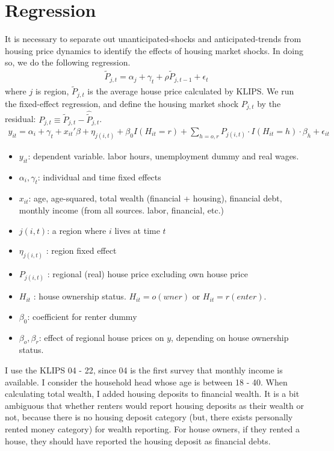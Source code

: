 \documentclass[12pt,letterpaper]{article}
\begin{document}
\section{Regression}
It is necessary to separate out unanticipated-shocks and anticipated-trends from housing price dynamics to identify the effects of housing market shocks. In doing so, we do the following regression.
\begin{eqnarray}
\tilde P_{j,t} = \alpha_j + \gamma_t + \rho \tilde P_{j,t-1} + \epsilon_t
\end{eqnarray}
where $j$ is region, $\tilde P_{j,t}$ is the average house price calculated by KLIPS. We run the fixed-effect regression, and define the housing market shock $P_{j,t}$ by the residual: $P_{j,t} \equiv \tilde P_{j,t} - \hat{\tilde P}_{j,t}$. 
\begin{eqnarray}
y_{it} = \alpha_i + \gamma_t + x_{it}'\beta + \eta_{j(i,t)} +\beta_0 I(H_{it} = r) + \sum_{h=o,r} P_{j(i,t)}\cdot I(H_{it} = h)\cdot\beta_{h} + \epsilon_{it}
\end{eqnarray}
\begin{itemize}
	\item $y_{it}$: dependent variable. labor hours, unemployment dummy and real wages.
	\item $\alpha_i,\gamma_t$: individual and time fixed effects			\item $x_{it}$: age, age-squared, total wealth (financial + housing), financial debt, monthly income (from all sources. labor, financial, etc.)
	\item $j(i,t)$: a region where $i$ lives at time $t$
	\item $\eta_{j(i,t)}$ : region fixed effect
	\item $P_{j(i,t)}$ : regional (real) house price excluding own house price
	\item $H_{it}$ : house ownership status. $H_{it} = o(wner)$ or $H_{it}=r(enter)$.
	\item $\beta_0$: coefficient for renter dummy
	\item $\beta_o,\beta_r$: effect of regional house prices on $y$, depending on house ownership status.
\end{itemize}
I use the KLIPS 04 - 22, since 04 is the first survey that monthly income is available. I consider the household head whose age is between 18 - 40. When calculating total wealth, I added housing deposits to financial wealth. It is a bit ambiguous that whether renters would report housing deposits as their wealth or not, because there is no housing deposit category (but, there exists personally rented money category) for wealth reporting. For house owners, if they rented a house, they should have reported the housing deposit as financial debts.
\newpage
\end{document}
